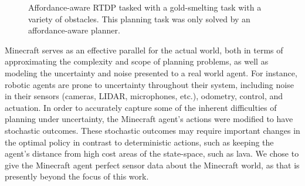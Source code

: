 \documentclass[conference]{IEEEtran}
\begin{document}
\begin{figure}
\centering
{}%
%
%
%
  \caption{Affordance-aware RTDP tasked with a gold-smelting task with a variety of obstacles. This planning task was
  only solved by an affordance-aware planner.}
  \label{fig:epicworld}
\end{figure}

Minecraft serves as an effective parallel for the actual world, both
in terms of approximating the complexity and scope of planning
problems, as well as modeling the uncertainty and noise presented to a
real world agent.  For instance, robotic agents are prone to
uncertainty throughout their system, including noise in their
sensors (cameras, LIDAR, microphones, etc.), odometry, control, and
actuation.  In order to accurately capture some of the inherent
difficulties of planning under uncertainty, the Minecraft agent's
actions were modified to have stochastic outcomes. These stochastic
outcomes may require important changes in the optimal policy in
contrast to deterministic actions, such as keeping the agent's
distance from high cost areas of the state-space, such as lava. We chose to give the Minecraft agent perfect
sensor data about the Minecraft world, as that is presently beyond the focus of this
work.
\end{document}
